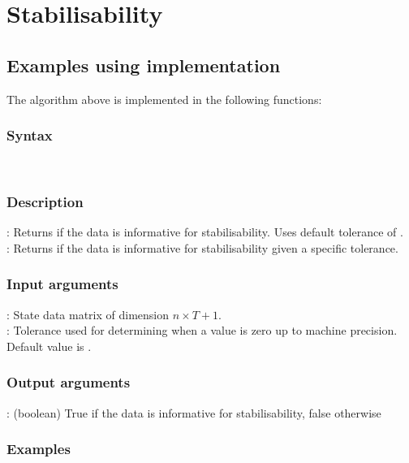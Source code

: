 \section{Stabilisability}










\subsection{Examples using implementation}
The algorithm above is implemented in the following functions:
\subsubsection*{Syntax}
 \\

\subsubsection*{Description}
: Returns if the data is informative for stabilisability. Uses default tolerance of .\\
: Returns if the data is informative for stabilisability given a specific tolerance.  

\subsubsection*{Input arguments}
\textbf{}: State data matrix of dimension $n \times T+1$.\\
\textbf{}: Tolerance used for determining when a value is zero up to machine precision. Default value is .

\subsubsection*{Output arguments}
\textbf{}: (boolean) True if the data is informative for stabilisability, false otherwise\\

\subsubsection{Examples}